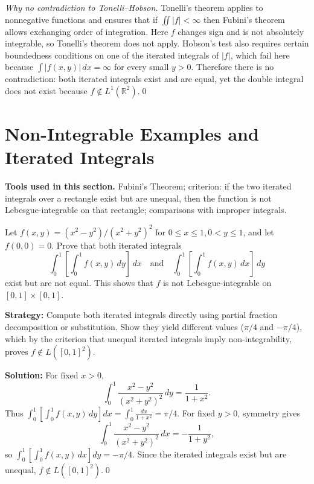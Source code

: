 \emph{Why no contradiction to Tonelli--Hobson.}
Tonelli's theorem applies to nonnegative functions and ensures that if \(\iint |f| < \infty\) then Fubini's theorem allows exchanging order of integration.  
Here \(f\) changes sign and is not absolutely integrable, so Tonelli's theorem does not apply.  
Hobson's test also requires certain boundedness conditions on one of the iterated integrals of \(|f|\), which fail here because \(\int |f(x,y)|\, dx = \infty\) for every small \(y > 0\).  
Therefore there is no contradiction: both iterated integrals exist and are equal, yet the double integral does not exist because \(f \notin L^1(\mathbb{R}^2)\).\qed
\section{Non-Integrable Examples and Iterated Integrals}

\noindent\textbf{Tools used in this section.} Fubini's Theorem; criterion: if the two iterated integrals over a rectangle exist but are unequal, then the function is not Lebesgue-integrable on that rectangle; comparisons with improper integrals.



\begin{problembox}
Let \( f(x, y) = (x^2 - y^2)/(x^2 + y^2)^2 \) for \( 0 \leq x \leq 1, 0 < y \leq 1 \), and let \( f(0, 0) = 0 \). Prove that both iterated integrals
\[
\int_0^1 \left[ \int_0^1 f(x, y) \, dy \right] \, dx \quad \text{and} \quad \int_0^1 \left[ \int_0^1 f(x, y) \, dx \right] \, dy
\]
exist but are not equal. This shows that \( f \) is not Lebesgue-integrable on \([0, 1] \times [0, 1]\).
\end{problembox}

\noindent\textbf{Strategy:} Compute both iterated integrals directly using partial fraction decomposition or substitution. Show they yield different values (\(\pi/4\) and \(-\pi/4\)), which by the criterion that unequal iterated integrals imply non-integrability, proves \(f \notin L([0,1]^2)\).

\bigskip\noindent\textbf{Solution:}
For fixed \(x>0\),
\[
\int_0^1 \frac{x^2-y^2}{(x^2+y^2)^2}\,dy = \frac{1}{1+x^2}.
\]
Thus \(\int_0^1[\int_0^1 f(x,y)\,dy]dx=\int_0^1\!\frac{dx}{1+x^2}=\pi/4\). For fixed \(y>0\), symmetry gives
\[
\int_0^1 \frac{x^2-y^2}{(x^2+y^2)^2}\,dx = -\frac{1}{1+y^2},
\]
so \(\int_0^1[\int_0^1 f(x,y)\,dx]dy=-\pi/4\). Since the iterated integrals exist but are unequal, \(f\notin L([0,1]^2)\).\qed


